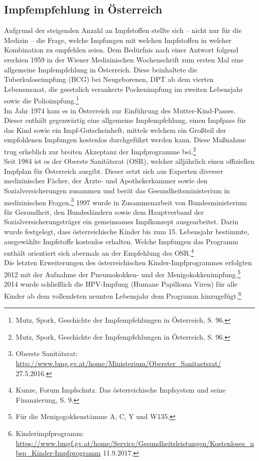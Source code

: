 \documentclass[
    a4paper,
    12pt,
    hyphens,
    chapterprefix=true,
    headheight=33pt,
    footheight=29pt,
    headings=optiontohead, %
]{scrartcl}
\begin{document}
\subsection{Impfempfehlung in Österreich}
Aufgrund der steigenden Anzahl an Impfstoffen stellte sich -- nicht nur für die Medizin -- die Frage, welche Impfungen mit welchen
Impfstoffen in welcher Kombination zu empfehlen seien. Dem Bedürfnis nach einer Antwort folgend erschien 1959 in der Wiener Medizinischen Wochenschrift
zum ersten Mal eine allgemeine Impfempfehlung in Österreich. Diese beinhaltete die Tuberkuloseimpfung (BCG) bei Neugeborenen, DPT ab
dem vierten Lebensmonat, die gesetzlich verankerte Pockenimpfung im zweiten Lebensjahr sowie die Polioimpfung.\footnote{Mutz, Spork,
Geschichte der Impfempfehlungen in Österreich, S. 96.}\\
Im Jahr 1974 kam es in Österreich zur Einführung des Mutter-Kind-Passes. Dieser enthält gegenwärtig
eine allgemeine Impfempfehlung, einen Impfpass für das Kind sowie ein Impf-Gutscheinheft, mittels welchem ein Großteil der empfohlenen
Impfungen kostenlos durchgeführt werden kann. Diese Maßnahme trug erheblich zur breiten Akzeptanz der Impfprogramme bei.\footnote{Mutz, Spork, Geschichte der Impfempfehlungen in Österreich, S. 96.} \\
Seit 1984 ist es der Oberste Sanitätsrat (OSR), welcher alljährlich einen offiziellen Impfplan für Österreich ausgibt. Dieser setzt sich aus Experten diverser medizinischer Fächer, der Ärzte- und Apothekerkammer sowie den Sozialversicherungen
zusammen und berät das Gesundheitsministerium in medizinischen Fragen.\footnote{Oberste Sanitätsrat: \url{http://www.bmg.gv.at/home/Ministerium/Oberster_Sanitaetsrat/} 27.5.2016.}
1997 wurde in Zusammenarbeit von Bundesministerium für Gesundheit, den Bundesländern sowie dem Hauptverband der Sozialversicherungsträger
ein gemeinsames Impfkonzept ausgearbeitet. Darin wurde festgelegt, dass österreichische Kinder bis zum 15. Lebensjahr bestimmte,
ausgewählte Impfstoffe kostenlos erhalten. Welche Impfungen das Programm enthält orientiert sich abermals an der Empfehlung des
OSR.\footnote{Kunze, Forum Impfschutz. Das österreichische Impfsystem und seine Finanzierung, S. 9.}\\
Die letzten Erweiterungen des österreichischen Kinder-Impfprogrammes erfolgten 2012 mit der Aufnahme der Pneumokokken- und der
Menigokokkenimpfung.\footnote{Für die Menigogokkenstämme A, C, Y und W135.} 2014 wurde schließlich die HPV-Impfung
(Humane Papilloma Viren) für alle Kinder ab dem vollendeten neunten Lebensjahr dem Programm hinzugefügt.\footnote{Kinderimpfprogramm: \url{https://www.bmgf.gv.at/home/Service/Gesundheitsleistungen/Kostenloses_nbsp_Kinder-Impfprogramm} 11.9.2017.}
\end{document}

